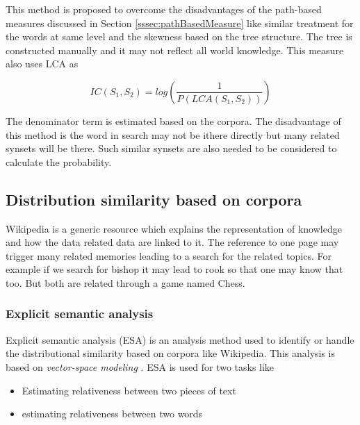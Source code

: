 \documentclass{bmcart}
\begin{document}
This method is proposed to overcome the disadvantages of the path-based measures discussed in Section \ref{sssec:pathBasedMeasure} like similar treatment for the words at same level and the skewness based on the tree structure. The tree is constructed manually and it may not reflect all world knowledge. This measure also uses LCA as

\begin{center}
\begin{equation}
IC(S_1,S_2)=log \left(  \frac{1}{P(LCA(S_1,S_2))}  \right)
\end{equation}
\end{center}

The denominator term is estimated based on the corpora. The disadvantage of this method is the word in search may not be ithere directly but many related synsets will be there. Such similar synsets are also needed to be considered to calculate the probability.

\subsection{Distribution similarity based on corpora}
\label{ssec:distSimilarityCorpora}
Wikipedia is a generic resource which explains the representation of knowledge and how the data related data are linked to it. The reference to one page may trigger many related memories leading to a search for the related topics. For example if we search for bishop it may lead to rook so that one may know that too. But both are related through a game named Chess. 

\subsubsection{Explicit semantic analysis}
\label{sssec:esa}
Explicit semantic analysis (ESA) is an analysis method used to identify or handle the distributional similarity based on corpora like Wikipedia. This analysis is based on {\it vector-space modeling} \cite{esa}. ESA is used for two tasks like
\begin{itemize}
\item Estimating relativeness  between two pieces of text
\item estimating relativeness between two words
\end{itemize}
\end{document}
